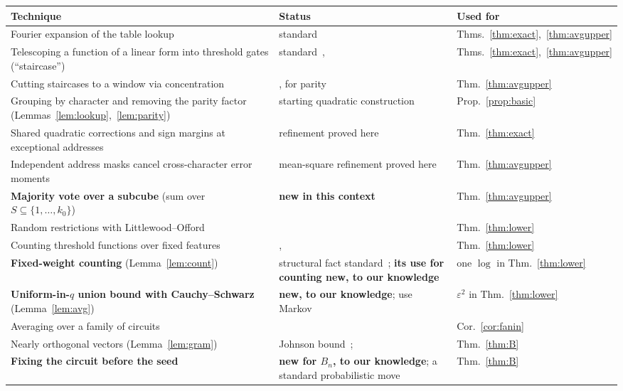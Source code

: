 \documentclass[11pt,letterpaper]{article}
\theoremstyle{remark}
\begin{document}
\begin{center}
\small
\renewcommand{\arraystretch}{1.25}
\begin{tabular}{@{}P{0.39\textwidth}P{0.33\textwidth}P{0.2\textwidth}@{}}
\toprule
Technique & Status & Used for\\
\midrule
Fourier expansion of the table lookup & standard & Thms.~\ref{thm:exact},~\ref{thm:avgupper}\\
Telescoping a function of a linear form into threshold gates (``staircase'') & standard~\cite[Prop.~1]{HMPST}, \cite{HP} & Thms.~\ref{thm:exact},~\ref{thm:avgupper}\\
Cutting staircases to a window via concentration & \cite[Thm.~1.4]{KW}, for parity & Thm.~\ref{thm:avgupper}\\
Grouping by character and removing the parity factor (Lemmas~\ref{lem:lookup},~\ref{lem:parity}) & starting quadratic construction & Prop.~\ref{prop:basic}\\
Shared quadratic corrections and sign margins at exceptional addresses & refinement proved here & Thm.~\ref{thm:exact}\\
Independent address masks cancel cross-character error moments & mean-square refinement proved here & Thm.~\ref{thm:avgupper}\\
\textbf{Majority vote over a subcube} (sum over $S\subseteq\{1,\dots,k_0\}$) & \textbf{new in this context} & Thm.~\ref{thm:avgupper}\\
Random restrictions with Littlewood--Offord & \cite[Lemmas~1.1, 3.1]{KW} & Thm.~\ref{thm:lower}\\
Counting threshold functions over fixed features & \cite{RSO}, \cite[Thm.~2.3]{KW} & Thm.~\ref{thm:lower}\\
\textbf{Fixed-weight counting} (Lemma~\ref{lem:count}) & structural fact standard~\cite{KW,CSS}; \textbf{its use for counting new, to our knowledge} & one $\log$ in Thm.~\ref{thm:lower}\\
\textbf{Uniform-in-$q$ union bound with Cauchy--Schwarz} (Lemma~\ref{lem:avg}) & \textbf{new, to our knowledge}; \cite{KW,KKL,CSS} use Markov & $\varepsilon^2$ in Thm.~\ref{thm:lower}\\
Averaging over a family of circuits & \cite[Cor.~1.1]{KW} & Cor.~\ref{cor:fanin}\\
Nearly orthogonal vectors (Lemma~\ref{lem:gram}) & Johnson bound~\cite{Gur}; \cite[Lemma~6.1]{KW} & Thm.~\ref{thm:B}\\
\textbf{Fixing the circuit before the seed} & \textbf{new for $B_n$, to our knowledge}; a standard probabilistic move & Thm.~\ref{thm:B}\\
\bottomrule
\end{tabular}
\end{center}
\end{document}

